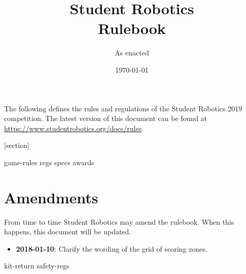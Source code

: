 \documentclass[a4paper, 11pt]{scrartcl}
\title {Student Robotics \sryear\\ Rulebook}
\author{As enacted}
\date{\today}
\newcommand{\sryear}{2019}
\begin{document}
\maketitle

\noindent The following defines the rules and regulations of the Student Robotics \sryear {} competition.  The latest version of this document can be found at \url{https://www.studentrobotics.org/docs/rules}.

[section]
\newcommand{\rcn}{\stepcounter{rule}\arabic{section}.\arabic{rule}}
\renewcommand{\labelenumi}{\rcn}

 {game-rules}
\newpage
 {regs}
\newpage
 {specs}
\newpage
 {awards}

\renewcommand{\labelenumi}{\rcn}

\section{Amendments}
From time to time Student Robotics may amend the rulebook.  When this happens, this document will be updated.

\begin{itemize}
\item \textbf{2018-01-10}: Clarify the wording of the grid of scoring zones.
\end{itemize}

\newpage
\appendix
\appendixpage
\addappheadtotoc
 {kit-return}
 {safety-regs}
\end{document}

